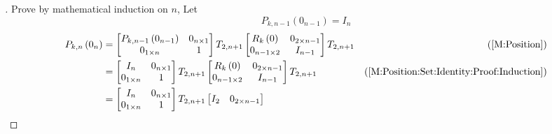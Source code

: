 \documentclass[stu, babel, american, biblatex, a4paper, leqno, draftall]{apa7}
\begin{document}
\begin{proof}[]
    Prove by mathematical induction on $n$,
    Let 
    \begin{equation}\label{M:Position:Set:Identity:Proof:Induction}
        P_{k,n-1}\left(0_{n-1}\right)=I_n
    \end{equation}
	\begin{align*}
		P_{k, n}\left(0_{n}\right)
		&=
		\begin{bmatrix}
            P_{k,n-1}\left(0_{n-1}\right) & 0_{n\times 1} \\
            0_{1\times n}                                                                                      & 1 \\
        \end{bmatrix}
        T_{2, n+1}
        \begin{bmatrix}
            R_{k}\left(0\right) & 0_{{2}\times{n-1}} \\
            0_{{n-1}\times{2}}                                   & {I}_{n-1} \\
        \end{bmatrix}
        T_{2, n+1} & \text{(\cref{M:Position})} \\
		&=
		\begin{bmatrix}
            I_{n} & 0_{n\times 1} \\
            0_{1\times n}                                                                                      & 1 \\
        \end{bmatrix}
        T_{2, n+1}
        \begin{bmatrix}
            R_{k}\left(0\right) & 0_{{2}\times{n-1}} \\
            0_{{n-1}\times{2}}                                   & {I}_{n-1} \\
        \end{bmatrix}
        T_{2, n+1} & \text{(\cref{M:Position:Set:Identity:Proof:Induction})} \\
		&=
		\begin{bmatrix}
            I_{n} & 0_{n\times 1} \\
            0_{1\times n}                                                                                      & 1 \\
        \end{bmatrix}
        T_{2, n+1}
        \begin{bmatrix}
            I_{2} & 0_{{2}\times{n-1}} \\

\end{bmatrix}
\end{align*}
\end{proof}
\end{document}
